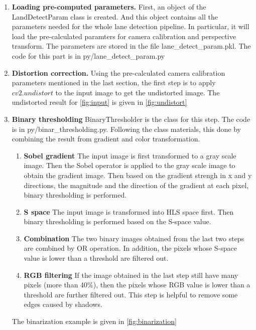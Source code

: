 \documentclass[12pt]{article}
\begin{document}
\begin{enumerate}
	\item \textbf{Loading pre-computed parameters.} First, an object of the LandDetectParam class is created. And this object contains all the parameters needed for the whole lane detection pipeline. In particular, it will load the pre-calculated paramters for camera calibration and perspective transform. The parameters are stored in the file lane\_detect\_param.pkl. The code for this part is in py/lane\_detect\_param.py
	 
	\item \textbf{Distortion correction.} Using the pre-calculated camera calibration parameters mentioned in the last section, the first step is to apply $cv2.undistort$ to the input image to get the undistorted image. The undistorted result for \ref{fig:input} is given in \ref{fig:undistort}

	\item  \textbf{Binary thresholding}  BinaryThresholder is the class for this step. The code is in py/binar\_thresholding.py. Following the class materials, this done by combining the result from gradient and color transformation.
		\begin{enumerate}
			\item \textbf{Sobel gradient} The input image is first transformed to a gray scale image. Then the Sobel operator is applied to the gray scale image to obtain the gradient image. Then based on the gradient strengh in x and y directions, the magnitude and the direction of the gradient at each pixel, binary thresholding is performed.

			\item  \textbf{S space} The input image is transformed into HLS space first. Then binary thresholding is performed based on the S-space value.
			\item \textbf{Combination} The two binary images obtained from the last two steps are combined by OR operation. In addition, the pixels whose S-space value is lower than a threshold are filtered out. 
			
			\item \textbf{RGB filtering} If the image obtained in the last step still have many pixels  (more than 40\%), then the pixels whose RGB value is lower than a threshold are further filtered out. This step is helpful to remove some edges caused by shadows.
			
		\end{enumerate}
	The binarization example is given in \ref{fig:binarization}
	

\end{enumerate}
\end{document}
